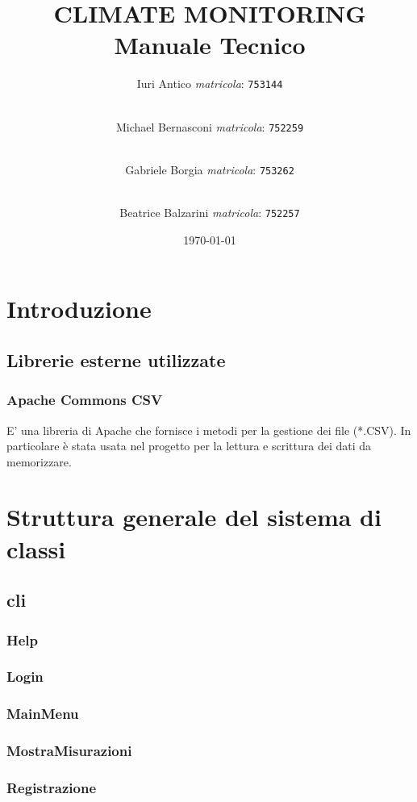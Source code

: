 \documentclass[a4paper, 12pt]{report}
\title {
	CLIMATE MONITORING \\
	Manuale Tecnico}
\author{
	Iuri Antico \textit{matricola}:
	\texttt{753144}
	\and \\
	Michael Bernasconi \textit{matricola}:
	\texttt{752259}
	\and \\
	Gabriele Borgia \textit{matricola}:
	\texttt{753262}
	\and \\
	Beatrice Balzarini \textit{matricola}:
	\texttt{752257}
}
\date{\today}
\begin{document}
	\makeatletter
	\begin{titlepage}
		\maketitle
	\end{titlepage}
	\makeatother

	\tableofcontents
	\listoffigures
	\listoftables

	\chapter{Introduzione}
		\section{Librerie esterne utilizzate}
			\subsection{Apache Commons CSV}
			E' una libreria di Apache che fornisce i metodi per la gestione dei file (*.CSV). In particolare è stata usata nel progetto per la lettura e scrittura dei dati da memorizzare.

	\chapter{Struttura generale del sistema di classi}
		\section{cli}
			\subsection{Help}
			\subsection{Login}
			\subsection{MainMenu}
			\subsection{MostraMisurazioni}
			\subsection{Registrazione}
\end{document}
